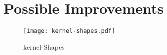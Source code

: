 
\section{Possible Improvements}
\label{sec:possible_improvements}


\begin{figure}[htbp]
	\centering
	\texttt{[image: kernel-shapes.pdf]}
	\caption{kernel-Shapes}\label{fig:kernel-shapes}
\end{figure}
